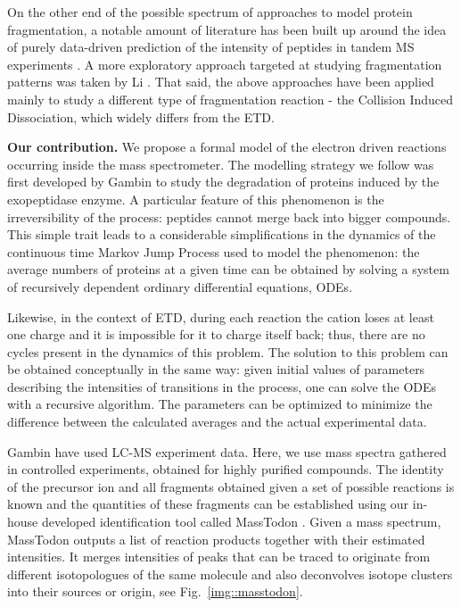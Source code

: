 \documentclass{llncs}
\begin{document}
        On the other end of the possible spectrum of approaches to model protein fragmentation, a notable amount of literature has been built up around the idea of purely data-driven prediction of the intensity of peptides in tandem MS experiments \cite{Elias2004-fr,Arnold2006-wn,Degroeve2013-ej} . A more exploratory approach targeted at studying fragmentation patterns was taken by Li \cite{Li2011-mq}. That said, the above approaches have been applied mainly to study a different type of fragmentation reaction - the Collision Induced Dissociation, which widely differs from the ETD.

\textbf{Our contribution.}
        We propose a formal model of the electron driven reactions occurring inside the mass spectrometer. The modelling strategy we follow was first developed by Gambin \cite{Gambin2010} to study the degradation of proteins induced by the exopeptidase enzyme. A particular feature of this phenomenon is the irreversibility of the process: peptides cannot merge back into bigger compounds. This simple trait leads to a considerable simplifications in the dynamics of the continuous time Markov Jump Process used to model the phenomenon: the average numbers of proteins at a given time can be obtained by solving a system of recursively dependent ordinary differential equations, ODEs.

        Likewise, in the context of ETD, during each reaction the cation loses at least one charge and it is impossible for it to charge itself back; thus, there are no cycles present in the dynamics of this problem. The solution to this problem can be obtained conceptually in the same way: given initial values of parameters describing the intensities of transitions in the process, one can solve the ODEs with a recursive algorithm. The parameters can be optimized to minimize the difference between the calculated averages and the actual experimental data.

        Gambin \cite{Gambin2010} have used LC-MS experiment data. Here, we use mass spectra gathered in controlled experiments, obtained for highly purified compounds. The identity of the precursor ion and all fragments obtained given a set of possible reactions is known and the quantities of these fragments can be established using our in-house developed identification tool called MassTodon \cite{Lermyte2015-lm,Lermyte2017-zt}. Given a mass spectrum, MassTodon outputs a list of reaction products together with their estimated intensities. It merges intensities of peaks that can be traced to originate from different isotopologues of the same molecule and also deconvolves isotope clusters into their sources or origin, see Fig.~\ref{img::masstodon}.
\end{document}
